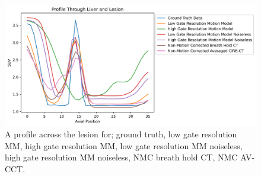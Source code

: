     \begin{figure}
        
        \centering
        
        \includegraphics[width=1.0\linewidth]{figures/profile.png}
        
        
        \captionsetup{singlelinecheck=false, justification=centering}
        \caption{A profile across the lesion for; ground truth, low gate resolution \gls{MM}, high gate resolution \gls{MM}, low gate resolution \gls{MM} noiseless, high gate resolution \gls{MM} noiseless, \gls{NMC} breath hold \gls{CT}, \gls{NMC} \gls{AV-CCT}.}
        
        \label{fig:profile}
        
    \end{figure}
    
